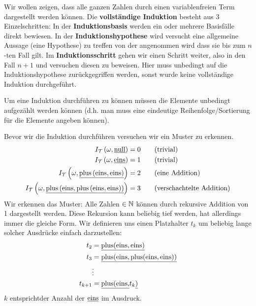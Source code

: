 \begin{bsp}
Wir wollen zeigen, dass alle ganzen Zahlen durch einen variablenfreien Term dargestellt werden können.
Die \textbf{vollständige Induktion} besteht aus 3 Einzelschritten: In der \textbf{Induktionsbasis} werden ein oder mehrere Basisfälle direkt bewiesen.
In der \textbf{Induktionshypothese} wird versucht eine allgemeine Aussage (eine Hypothese) zu treffen von der angenommen wird dass sie bis zum $n$-ten Fall gilt.
Im \textbf{Induktionsschritt} gehen wir einen Schritt weiter, also in den Fall $n+1$ und versuchen diesen zu beweisen. Hier muss unbedingt auf die Induktionshypothese zurückgegriffen
werden, sonst wurde keine vollständige Induktion durchgeführt.

Um eine Induktion durchführen zu können müssen die Elemente unbedingt aufgezählt werden können (d.h. man muss eine eindeutige Reihenfolge/Sortierung für die Elemente angeben können).

Bevor wir die Induktion durchführen versuchen wir ein Muster zu erkennen.
\begin{align*}
I_{\mathcal{T}}\left(\omega,\underline{\operatorname*{null}}\right)&=0 \tag{trivial}\\
I_{\mathcal{T}}\left(\omega,\underline{\operatorname*{eins}}\right)&=1 \tag{trivial}\\
I_{\mathcal{T}}\left(\omega,\underline{\operatorname*{plus}\left(\operatorname*{eins},\operatorname*{eins}\right)}\right)&=2 \tag{eine Addition}\\
I_{\mathcal{T}}\left(\omega,\underline{\operatorname*{plus}\left(\operatorname*{eins},\operatorname*{plus}\left(\operatorname*{eins},\operatorname*{eins}\right)\right)}\right)&=3 \tag{verschachtelte Addition}
\end{align*}
Wir erkennen das Muster: Alle Zahlen $\in \mathbb{N}$ können durch rekursive Addition von 1 dargestellt werden.
Diese Rekursion kann beliebig tief werden, hat allerdings immer die gleiche Form.
Wir definieren uns einen Platzhalter $t_k$ um beliebig lange solcher Ausdrücke einfach darzustellen:
\begin{align*}
t_2 &= \underline{\operatorname*{plus}(\operatorname*{eins},\operatorname*{eins})} \\
t_3 &= \underline{\operatorname*{plus}(\operatorname*{eins},\operatorname*{plus}(\operatorname*{eins},\operatorname*{eins}))} \\
&\vdots \\
t_{k+1} &= \underline{\operatorname*{plus}(\operatorname*{eins},}t_{k}\underline{)} \\
\end{align*}
$k$ entsprichtder Anzahl der $\underline{\operatorname*{eins}}$ im Ausdruck.


\end{bsp}
